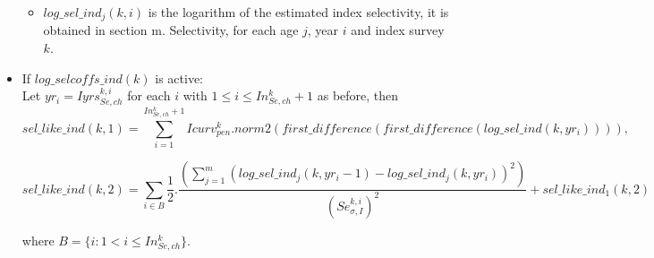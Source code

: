 \documentclass{article}
\begin{document}
\begin{itemize}
\begin{itemize}
        \item $log\_sel\_ind_j(k,i)$  is the logarithm of the estimated index selectivity, it is obtained in section m. Selectivity, for each age $j$, year $i$ and index survey $k$.

    \end{itemize}
    
    \item If $log\_selcoffs\_ind(k)$ is active:\\
    
    Let $yr_i = Iyrs_{Se,ch}^{k,i}$ for each $i$ with $1\leq i \leq In_{Se,ch}^k+1$ as before, then 
    \begin{equation}
sel\_like\_ind(k,1) = \sum_{i=1}^{In_{Se,ch}^k+1} Icurv_{pen}^k.norm2(first\_difference( first\_difference(log\_sel\_ind(k,yr_i)))),
    \end{equation}

    \begin{equation}
sel\_like\_ind(k,2)    =\sum_{i\in B} \dfrac{1}{2}.\dfrac{\left(\sum_{j=1}^m(log\_sel\_ind_j(k,yr_i-1)-log\_sel\_ind_j(k,yr_i))^2\right)}{(Se_{\sigma,I}^{k,i})^2} + sel\_like\_ind_1(k,2)
    \end{equation}

    where $B=\{i: 1 <i \leq In_{Se,ch}^k\}$.\\


\end{itemize}
\end{document}
